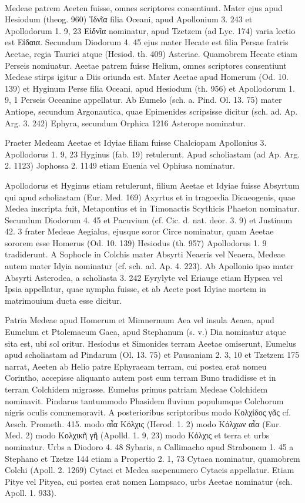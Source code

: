 \documentclass[landscape, a4paper, 11pt, oneside, polutonikogreek, german]{article}
\begin{document}
\paragraph{}
Medeae patrem Aeeten fuisse, omnes scriptores consentiunt. Mater ejus apud Hesiodum (theog. 960) Ἰδνῖα filia Oceani, apud Apollonium 3. 243 et Apollodorum 1. 9, 23 Εἰδνῖα nominatur, apud Tzetzem (ad Lyc. 174) varia lectio est Εἰδαια. Secundum Diodorum 4. 45 ejus mater Hecate est filia Persae fratris Aeetae, regia Taurici atque (Hesiod. th. 409) Asteriae. Quamobrem Hecate etiam Perseis nomiuatur. Aeetae patrem fuisse Helium, omnes scriptores consentiunt Medeae stirps igitur a Diis oriunda est. Mater Aeetae apud Homerum (Od. 10. 139) et Hyginum Perse filia Oceani, apud Hesiodum (th. 956) et Apollodorum 1. 9, 1 Perseis Oceanine appellatur. Ab Eumelo (sch. a. Pind. Ol. 13. 75) mater Antiope, secundum Argonautica, quae Epimenides scripsisse dicitur (sch. ad. Ap. Arg. 3. 242) Ephyra, secundum Orphica 1216 Asterope nominatur.

Praeter Medeam Aeetae et Idyiae filiam fuisse Chalciopam Apollonius 3. Apollodorus 1. 9, 23 Hyginus (fab. 19) retulerunt. Apud scholiastam (ad Ap. Arg. 2. 1123) Jophossa 2. 1149 etiam Euenia vel Ophiusa nominatur.

Apollodorus et Hyginus etiam retulerunt, filium Aeetae et Idyiae fuisse Absyrtum qui apud scholiastam (Eur. Med. 169) Axyrtus et in tragoedia Dicaeogenis, quae Medea inscripta fuit, Metapontius et in Timonactis Scythicis Phaeton nominatur. Secundum Diodorum 4. 45 et Pacuvium (cf. Cic. d. nat. deor. 3. 9) et Justinum 42. 3 frater Medeae Aegialus, ejusque soror Circe nominatur, quam Aeetae sororem esse Homerus (Od. 10. 139) Hesiodus (th. 957) Apollodorus 1. 9 tradiderunt. A Sophocle in Colchis mater Absyrti Neaeris vel Neaera, Medeae autem mater Idyia nominatur (cf. sch. ad. Ap. 4. 223). Ab Apollonio ipso mater Absyrti Asterodea, a scholiasta 3. 242 Eyrylyte vel Eriauge etiam Hypsea vel Ipsia appellatur, quae nympha fuisse, et ab Aeete post Idyiae mortem in matrimouium ducta esse dicitur.

Patria Medeae apud Homerum et Mimnermum Aea vel insula Aeaea, apud Eumelum et Ptolemaeum Gaea, apud Stephanum (s. v.) Dia nominatur atque sita est, ubi sol oritur. Hesiodus et Simonides terram Aeetae omiserunt, Eumelus apud scholiastam ad Pindarum (Ol. 13. 75) et Pausaniam 2. 3, 10 et Tzetzem 175 narrat, Aeeten ab Helio patre Ephyraeam terram, cui postea erat nomeu Corintho, accepisse aliquanto autem post eum terram Buno tradidisse et in terram Colchidem migrasse. Eumelus primus patriam Medeae Colchidem nominavit. Pindarus tantummodo Phasidem fluvium populumque Colchorum nigris oculis commemoravit. A posterioribus scriptoribus modo Κολχίδος γᾶς cf. Aesch. Prometh. 415. modo αἶα Κόλχις (Herod. 1. 2) modo Κόλχων αἶα (Eur. Med. 2) modo Κολχικῆ γῆ (Apolld. 1. 9, 23) modo Κόλχις et terra et urbs nominatur. Urbs a Diodoro 4. 48 Sybaris, a Callimacho apud Strabonem 1. 45 a Stephano et Tzetze 144 etiam a Propertio 2. 1, 73 Cytaea nominatur, quamobrem Colchi (Apoll. 2. 1269) Cytaei et Medea saepenumero Cytaeis appellatur. Etiam Pitye vel Pityea, cui postea erat nomen Lampsaco, urbs Aeetae nominatur (sch. Apoll. 1. 933).
\end{document}
